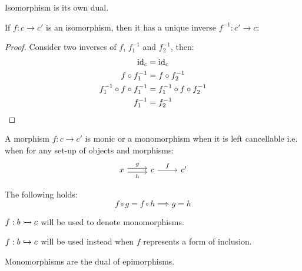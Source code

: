 \begin{remark}
  Isomorphism is its own dual.
\end{remark}

\begin{theorem}
  If $f: c\to c'$ is an isomorphism, then it has a unique inverse $f^{-1}:c'\to
  c$:

  \begin{proof}
    Consider two inverses of $f$, $f^{-1}_1$ and $f^{-1}_2$, then:
    \[
      \begin{aligned}
        \mathrm{id}_c &= \mathrm{id}_c\\
        f\circ f^{-1}_1 &= f\circ f^{-1}_2\\
        f^{-1}_1 \circ f \circ f^{-1}_1 &= f^{-1}_1 \circ f \circ f^{-1}_2\\
        f^{-1}_1 &= f^{-1}_2
      \end{aligned}
    \]
  \end{proof}
\end{theorem}

\begin{definition}
  A morphism $f:c\to c'$ is monic or a monomorphism when it is left
  cancellable \parencite{lane:working_mathematician} i.e. when for any
  set-up of objects and morphisms:
  \[\begin{tikzcd}[ampersand replacement=\&]
    x \& c \& {c'}
    \arrow["f", from=1-2, to=1-3]
    \arrow["g", shift left=1, from=1-1, to=1-2]
    \arrow["h"', shift right=1, from=1-1, to=1-2]
  \end{tikzcd}\]

  The following holds:
  \[f \circ g = f \circ h \implies g = h\]
\end{definition}

\begin{remark}
  $f:b\rightarrowtail c$ will be used to denote monomorphisms.
\end{remark}

\begin{remark}
  $f:b\hookrightarrow c$ will be used instead when $f$ represents a form of inclusion.
\end{remark}

\begin{remark}
  Monomorphisms are the dual of epimorphisms.
\end{remark}

